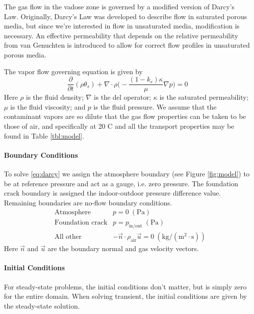 The gas flow in the vadose zone is governed by a modified version of Darcy's Law.
Originally, Darcy's Law was developed to describe flow in saturated porous media, but since we're interested in flow in unsaturated media, modification is necessary.
An effective permeability that depends on the relative permeability from van Genuchten is introduced to allow for correct flow profiles in unsaturated porous media.\par

The vapor flow governing equation is given by
\begin{equation}\label{eq:darcy}
  \frac{\partial}{\partial t} (\rho \theta_s) + \nabla \cdot \rho \Big( -\frac{(1-k_r) \kappa}{\mu} \nabla p \Big) = 0
\end{equation}
Here $\rho$ is the fluid density;
$\nabla$ is the del operator;
$\kappa$ is the saturated permeability;
$\mu$ is the fluid viscosity; and $p$ is the fluid pressure.
We assume that the contaminant vapors are so dilute that the gas flow properties can be taken to be those of air, and specifically at 20 \degree C and all the transport properties may be found in Table \ref{tbl:model}.\par

\paragraph{Boundary Conditions}

To solve \eqref{eq:darcy} we assign the atmosphere boundary (see Figure \ref{fig:model}) to be at reference pressure and act as a gauge, i.e. zero pressure.
The foundation crack boundary is assigned the indoor-outdoor pressure difference value.
Remaining boundaries are no-flow boundary conditions.
\begin{align}
  &\text{Atmosphere} & p = 0 \; \mathrm{(Pa)} \\
  &\text{Foundation crack} & p = p_\mathrm{in/out} \; \mathrm{(Pa)} \\
  &\text{All other} & -\vec{n}\cdot\rho_\mathrm{air}\vec{u} = 0 \; \mathrm{(kg/(m^2\cdot s))}
\end{align}
Here $\vec{n}$ and $\vec{u}$ are the boundary normal and gas velocity vectors.

\paragraph{Initial Conditions}

For steady-state problems, the initial conditions don't matter, but is simply zero for the entire domain.
When solving transient, the initial conditions are given by the steady-state solution.\par

